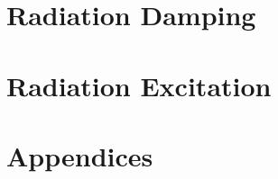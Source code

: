 \documentclass[ebook,a4paper,12pt,oneside,openany]{memoir}
\numberwithin{equation}{chapter}
\begin{document}
\chapter{Radiation Damping} \label{ch:4}
    
    
    
    

\chapter{Radiation Excitation} \label{ch:5}
    
    
    
    
    
    
    
    

\chapter{Appendices} \label{ch:app}
    
    
    
    
    



\end{document}
